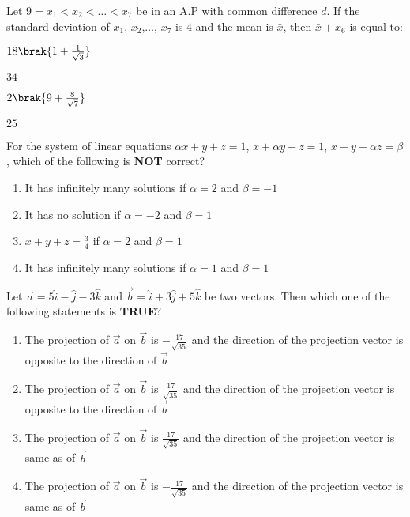 \iffalse
\title{2023}
\author{EE24Btech11024 - G. Abhimanyu Koushik}
\section{mcq-single}
\fi

\item Let $9=x_1<x_2<\dots <x_7$ be in an A.P with common difference $d$. If the standard deviation of $x_1$, $x_2$,$\dots$, $x_7$ is $4$ and the mean is $\bar{x}$, then $\bar{x}+x_6$ is equal to:

\hfill{}
\begin{enumerate}
\begin{multicols}{4}
\item $18\brak{1+\frac{1}{\sqrt{3}}}$
\item $34$
\item $2\brak{9+\frac{8}{\sqrt{7}}}$
\item $25$
\end{multicols}
\end{enumerate}

\item For the system of linear equations $\alpha x+y+z=1$, $x+\alpha y+z=1$, $x+y+\alpha z=\beta$, which of the following is \textbf{NOT} correct?

\hfill{}
\begin{enumerate}
\item It has infinitely many solutions if $\alpha=2$ and $\beta=-1$
\item It has no solution if $\alpha=-2$ and $\beta=1$
\item $x+y+z=\frac{3}{4}$ if $\alpha=2$ and $\beta=1$
\item It has infinitely many solutions if $\alpha=1$ and $\beta=1$
\end{enumerate}

\item Let $\vec{a}=5\hat{i}-\hat{j}-3\hat{k}$ and $\vec{b}=\hat{i}+3\hat{j}+5\hat{k}$ be two vectors. Then which one of the following statements is \textbf{TRUE}?

\hfill{}
\begin{enumerate}
\item The projection of $\vec{a}$ on $\vec{b}$ is $-\frac{17}{\sqrt{35}}$ and the direction of the projection vector is opposite to the direction of $\vec{b}$	
\item The projection of $\vec{a}$ on $\vec{b}$ is $\frac{17}{\sqrt{35}}$ and the direction of the projection vector is opposite to the direction of $\vec{b}$
\item The projection of $\vec{a}$ on $\vec{b}$ is $\frac{17}{\sqrt{35}}$ and the direction of the projection vector is same as of $\vec{b}$ 
\item The projection of $\vec{a}$ on $\vec{b}$ is $-\frac{17}{\sqrt{35}}$ and the direction of the projection vector is same as of $\vec{b}$
\end{enumerate}

